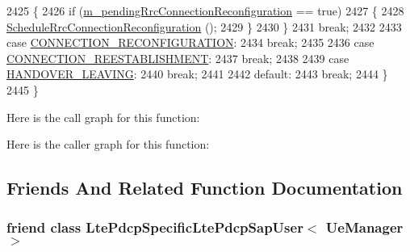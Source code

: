 \begin{DoxyCode}
2425       \{
2426         \textcolor{keywordflow}{if} (\hyperlink{classns3_1_1UeManager_ac1e5bf47aad07288d2676bb09e63e215}{m\_pendingRrcConnectionReconfiguration} == \textcolor{keyword}{true})
2427           \{
2428             \hyperlink{classns3_1_1UeManager_add763d882c14c2f1414167668f6ca095}{ScheduleRrcConnectionReconfiguration} ();
2429           \}
2430       \}
2431       \textcolor{keywordflow}{break};
2432 
2433     \textcolor{keywordflow}{case} \hyperlink{classns3_1_1UeManager_a2f4085fdd18d7125c27da44a5b8b6808abd13cee86acc2cb3c04241dec919c73f}{CONNECTION\_RECONFIGURATION}:
2434       \textcolor{keywordflow}{break};
2435 
2436     \textcolor{keywordflow}{case} \hyperlink{classns3_1_1UeManager_a2f4085fdd18d7125c27da44a5b8b6808a2e74c6adfadd2e6826deb4fec7e94520}{CONNECTION\_REESTABLISHMENT}:
2437       \textcolor{keywordflow}{break};
2438 
2439     \textcolor{keywordflow}{case} \hyperlink{classns3_1_1UeManager_a2f4085fdd18d7125c27da44a5b8b6808ae67953d7b8e117cbd2cab21a1fcde8ad}{HANDOVER\_LEAVING}:
2440       \textcolor{keywordflow}{break};
2441 
2442     \textcolor{keywordflow}{default}:
2443       \textcolor{keywordflow}{break};
2444     \}
2445 \}
\end{DoxyCode}


Here is the call graph for this function\+:




Here is the caller graph for this function\+:




\subsection{Friends And Related Function Documentation}
\subsubsection[{\texorpdfstring{Lte\+Pdcp\+Specific\+Lte\+Pdcp\+Sap\+User$<$ Ue\+Manager $>$}{LtePdcpSpecificLtePdcpSapUser< UeManager >}}]{\setlength{\rightskip}{0pt plus 5cm}friend class {\bf Lte\+Pdcp\+Specific\+Lte\+Pdcp\+Sap\+User}$<$ {\bf Ue\+Manager} $>$\hspace{0.3cm}{\ttfamily [friend]}}\hypertarget{classns3_1_1UeManager_a99276a0379b8384b466b4c79710608de}{}\label{classns3_1_1UeManager_a99276a0379b8384b466b4c79710608de}


